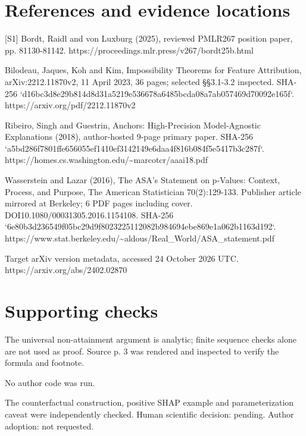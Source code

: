 \documentclass[10pt]{article}
\begin{document}
\section*{References and evidence locations}
[S1] Bordt, Raidl and von Luxburg (2025), reviewed PMLR267 position paper, pp. 81130-81142.
https://proceedings.mlr.press/v267/bordt25b.html\par
[S2] Bilodeau, Jaques, Koh and Kim, Impossibility Theorems for Feature Attribution, arXiv:2212.11870v2, 11 April 2023, 36 pages; selected §§3.1-3.2 inspected. SHA-256 `d16bc3d8e29b814d8d31a5219e536678a6485bcda08a7ab057469d70092e165f`.
https://arxiv.org/pdf/2212.11870v2\par
[S3] Ribeiro, Singh and Guestrin, Anchors: High-Precision Model-Agnostic Explanations (2018), author-hosted 9-page primary paper. SHA-256 `a5bd286f7801ffe656055ef1410ef3142149e6daa4f816b084f5e5417b3c287f`.
https://homes.cs.washington.edu/\textasciitilde{}marcotcr/aaai18.pdf\par
[S4] Wasserstein and Lazar (2016), The ASA’s Statement on p-Values: Context, Process, and Purpose, The American Statistician 70(2):129-133. Publisher article mirrored at Berkeley; 6 PDF pages including cover. DOI10.1080/00031305.2016.1154108. SHA-256 `6e80b3d236549f05bc29d9f8023225112082b984694ebe869e1a062b1163d192`.
https://www.stat.berkeley.edu/\textasciitilde{}aldous/Real\_World/ASA\_statement.pdf\par
[S5] Target arXiv version metadata, accessed 24 October 2026 UTC.
https://arxiv.org/abs/2402.02870\par
\section*{Supporting checks}
The universal non-attainment argument is analytic; finite sequence checks alone are not used as proof. Source p. 3 was rendered and inspected to verify the formula and footnote.\par
No author code was run.\par
The counterfactual construction, positive SHAP example and parameterization caveat were independently checked. Human scientific decision: pending. Author adoption: not requested.\par
\end{document}
